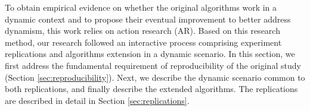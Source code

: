 
To obtain empirical evidence on whether the original algorithms work in a dynamic context and to propose their eventual improvement to better address dynamism, this work relies on action research (AR)\cite{action_research}. Based on this research method, our research followed an interactive process comprising experiment replications and algorithms extension in a dynamic scenario. In this section, we first address the fundamental requirement of reproducibility of the original study (Section \ref{sec:reproducibility}). Next,  we describe the dynamic scenario common to both replications, and finally describe the extended algorithms. The replications are described in detail in Section \ref{sec:replications}. 
